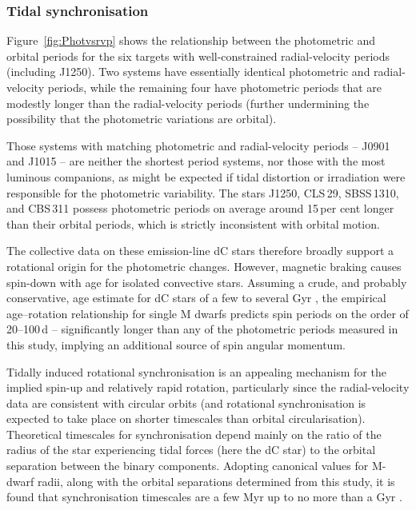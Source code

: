 \documentclass[fleqn,usenatbib,useAMS]{mnras}
\begin{document}
\subsubsection{Tidal synchronisation}

Figure~\ref{fig:Photvsrvp} shows the relationship between the photometric and orbital periods for the six targets with well-constrained radial-velocity periods (including J1250).  Two systems have essentially identical photometric and radial-velocity periods, while the remaining four have photometric periods that are modestly longer than the radial-velocity periods (further undermining the possibility that the photometric variations are orbital).  
 
Those systems with matching photometric and radial-velocity periods -- J0901 and J1015 -- are neither the shortest period systems, nor those with the most luminous companions, as might be expected if tidal distortion or irradiation were responsible for the photometric variability.  The stars J1250, CLS\,29, SBSS\,1310, and CBS\,311 possess photometric periods on average around 15\,per cent longer than their orbital periods, which is strictly inconsistent with orbital motion.  

The collective data on these emission-line dC stars therefore broadly support a rotational origin for the photometric changes.  However, magnetic braking causes spin-down with age for isolated convective stars.  Assuming a crude, and probably conservative, age estimate for dC stars of a few to several Gyr \citep{Farihi18}, the empirical age--rotation relationship for single M dwarfs predicts spin periods on the order of 20--100\,d \citep{Engle_2018} -- significantly longer than any of the photometric periods measured in this study, implying an additional source of spin angular momentum.  

Tidally induced rotational synchronisation is an appealing mechanism for the implied spin-up and relatively rapid rotation, particularly since the radial-velocity data are consistent with circular orbits (and rotational synchronisation is expected to take place on shorter timescales than orbital circularisation).
Theoretical timescales for synchronisation depend mainly on the ratio of the radius of the star experiencing tidal forces (here the dC star) to the orbital separation between the binary components.  Adopting canonical values for M-dwarf radii, along with the orbital separations determined from this study, it is found that synchronisation timescales are a few Myr up to no more than a Gyr \citep{Zahn89,Zahn}.  
\end{document}

